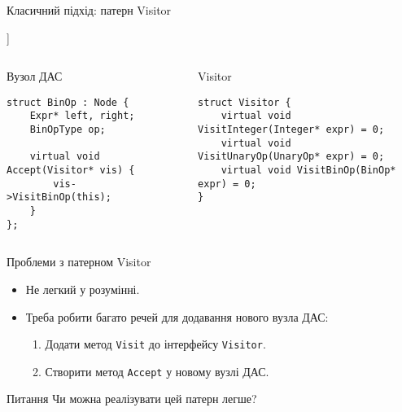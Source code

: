 \documentclass{beamer}
\begin{document}
	\begin{frame}[fragile]{Класичний підхід: патерн Visitor}
		\begin{center}
			\begin{forest}
				[Expression problem
				[ДАС як клас
					(\textit{дані}) ]
				[\underline{Функції як \textbf{клас}}
					(\textit{код}) ] ]
			\end{forest}
		\end{center}
		
		\begin{columns}
			\begin{column}{0.47\textwidth}
				\begin{exampleblock}{\small Вузол ДАС}
\begin{verbatim}
struct BinOp : Node {
	Expr* left, right;
	BinOpType op;

	virtual void Accept(Visitor* vis) {
		vis->VisitBinOp(this);	
	}
};
\end{verbatim}
				\end{exampleblock}
			\end{column}
		
			\begin{column}{0.47\textwidth}
				\begin{block}{\small Visitor}
\begin{verbatim}
struct Visitor {
	virtual void VisitInteger(Integer* expr) = 0;
	virtual void VisitUnaryOp(UnaryOp* expr) = 0;
	virtual void VisitBinOp(BinOp* expr) = 0;
}
\end{verbatim}
				\end{block}
			\end{column}
		\end{columns}
	\end{frame}

	\begin{frame}{Проблеми з патерном Visitor}
		\begin{itemize}
			\item Не легкий у розумінні.
			\item Треба робити багато речей для додавання нового вузла ДАС:
			\begin{enumerate}
				\item Додати метод \texttt{Visit} до інтерфейсу \texttt{Visitor}.
				\item Створити метод \texttt{Accept} у новому вузлі ДАС.
			\end{enumerate}
		\end{itemize}
		
		\vspace{30pt}
		
		\begin{block}{Питання}
			Чи можна реалізувати цей патерн легше?
		\end{block}
	\end{frame}
\end{document}
